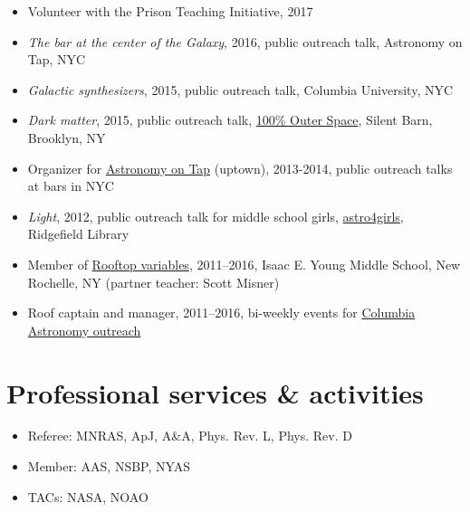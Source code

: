 \documentclass[12pt, letterpaper]{apw-cv}
\begin{document}
\begin{itemize}
    \item Volunteer with the Prison Teaching Initiative, 2017
    \item \emph{The bar at the center of the Galaxy}, 2016, public outreach talk, Astronomy on Tap, NYC
    \item \emph{Galactic synthesizers}, 2015, public outreach talk, Columbia University, NYC
    \item \emph{Dark matter}, 2015, public outreach talk, \href{http://silentbarn.org/2015/03/100-outer-space-party}{100\% Outer Space}, Silent Barn, Brooklyn, NY
    \item Organizer for \href{http://astronomyontap.org/}{Astronomy on Tap} (uptown), 2013-2014, public outreach talks at bars in NYC
    \item \emph{Light}, 2012, public outreach talk for middle school girls, \href{http://www.newstimes.com/news/article/Astronomer-Shoot-for-the-stars-3380793.php}{astro4girls}, Ridgefield Library
    \item Member of \href{http://rv.astro.columbia.edu}{Rooftop variables}, 2011--2016, Isaac E. Young Middle School, New Rochelle, NY (partner teacher: Scott Misner)
    \item Roof captain and manager, 2011--2016, bi-weekly events for \href{http://outreach.astro.columbia.edu/}{Columbia Astronomy outreach}
\end{itemize}

\section*{Professional services \& activities}

\begin{itemize}
	\item Referee: MNRAS, ApJ, A\&A, Phys. Rev. L, Phys. Rev. D
	\item Member: AAS, NSBP, NYAS
    \item TACs: NASA, NOAO
\end{itemize}
\end{document}

